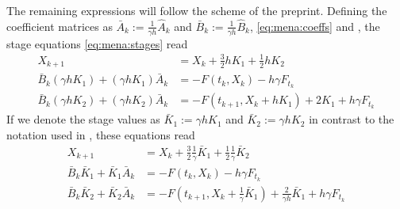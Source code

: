 The remaining expressions will follow the scheme of the preprint.
Defining the coefficient matrices as
$\bar{A}_k := \frac{1}{\gamma h} \hat{A}_k$ and
$\bar{B}_k := \frac{1}{\gamma h} \hat{B}_k$,
\cf \eqref{eq:mena:coeffs} and \cite[7]{MPIMD11-06},
the stage equations \eqref{eq:mena:stages} read
\begin{subequations}
\begin{align}
  X_{k+1} &= X_k + \tfrac{3}{2} h K_1 + \tfrac{1}{2} h K_2 \\
  \bar{B}_k (\gamma h K_1) + (\gamma h K_1) \bar{A}_k &= -F(t_k, X_k) - h\gamma F_{t_k} \\
  \bar{B}_k (\gamma h K_2) + (\gamma h K_2) \bar{A}_k &= -F(t_{k+1}, X_k + hK_1) + 2K_1 + h\gamma F_{t_k}
\end{align}
\end{subequations}
If we denote the stage values as $\bar{K}_1 := \gamma h K_1$ and $\bar{K}_2 := \gamma h K_2$
in contrast to the notation used in \cite{MPIMD11-06},
these equations read
\begin{subequations}\label{eq:mpi11:15}
\begin{align}
  X_{k+1} &= X_k + \tfrac{3}{2} \tfrac{1}{\gamma} \bar{K}_1 + \tfrac{1}{2} \tfrac{1}{\gamma} \bar{K}_2 \\
  \bar{B}_k \bar{K}_1 + \bar{K}_1 \bar{A}_k &= -F(t_k, X_k) - h\gamma F_{t_k} \\
  \bar{B}_k \bar{K}_2 + \bar{K}_2 \bar{A}_k &= -F(t_{k+1}, X_k + \tfrac{1}{\gamma}\bar{K}_1) + \tfrac{2}{\gamma h}\bar{K}_1 + h\gamma F_{t_k}
\end{align}
\end{subequations}

